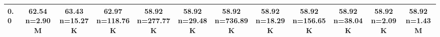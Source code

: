 \begin{table}
\begin{tabular}{lccccccccccc}
0.0 & \makecell{62.54 \\ \scriptsize n=2.90M} & \makecell{63.43 \\ \scriptsize n=15.27K} & \makecell{62.97 \\ \scriptsize n=118.76K} & \makecell{58.92 \\ \scriptsize n=277.77K} & \makecell{58.92 \\ \scriptsize n=29.48K} & \makecell{58.92 \\ \scriptsize n=736.89K} & \makecell{58.92 \\ \scriptsize n=18.29K} & \makecell{58.92 \\ \scriptsize n=156.65K} & \makecell{58.92 \\ \scriptsize n=38.04K} & \makecell{58.92 \\ \scriptsize n=2.09K} & \makecell{58.92 \\ \scriptsize n=1.43M} \\
            \bottomrule
            \end{tabular}
            \label{tab:si-disruption-matrix-5}
            \end{table}